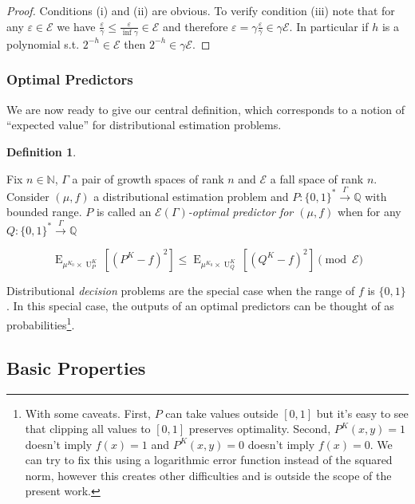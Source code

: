 \documentclass{article}
\numberwithin{equation}{section}
\theoremstyle{definition}
\newtheorem{definition}{Definition}[section]
\theoremstyle{plain}
\newcommand{\Bool}{\{0,1\}}
\newcommand{\Words}{{\Bool^*}}
\DeclareMathOperator{\E}{E}
\DeclareMathOperator{\Un}{U}
\newcommand{\Nats}{\mathbb{N}}
\newcommand{\Rats}{\mathbb{Q}}
\newcommand{\Fall}{\mathcal{E}}
\newcommand{\EG}{\Fall(\Gamma)}
\newcommand{\Scheme}{\xrightarrow{\Gamma}}
\begin{document}
\begin{proof}

Conditions (i) and (ii) are obvious. To verify condition (iii) note that for any $\varepsilon \in \Fall$ we have $\frac{\varepsilon}{\gamma} \leq \frac{\varepsilon}{\inf \gamma} \in \Fall$ and therefore $\varepsilon = \gamma \frac{\varepsilon}{\gamma} \in \gamma \Fall$. In particular if $h$ is a polynomial s.t. $2^{-h} \in \Fall$ then $2^{-h} \in \gamma \Fall$.
%
\end{proof}

\subsubsection{Optimal Predictors}

We are now ready to give our central definition, which corresponds to a notion of \enquote{expected value} for distributional estimation problems.

\begin{definition}
\label{def:op}

Fix $n \in \Nats$, $\Gamma$ a pair of growth spaces of rank $n$ and $\Fall$ a fall space of rank $n$. Consider $(\mu,f)$ a distributional estimation problem and $P: \Words \Scheme \Rats$ with bounded range. $P$ is called an \emph{$\EG$-optimal predictor for $(\mu,f)$} when for any $Q: \Words \Scheme \Rats$

\begin{equation}
\label{eqn:op}
\E_{\mu^{K_0} \times \Un_P^K}[(P^K - f)^2] \leq \E_{\mu^{K_0} \times \Un_Q^K}[(Q^K - f)^2] \pmod \Fall
\end{equation}

\end{definition}

Distributional \emph{decision} problems are the special case when the range of $f$ is $\Bool$. In this special case, the outputs of an optimal predictors can be thought of as probabilities\footnote{With some caveats. First, $P$ can take values outside $[0,1]$ but it's easy to see that clipping all values to $[0,1]$ preserves optimality. Second, $P^{K}(x,y)=1$ doesn't imply $f(x) = 1$ and $P^{K}(x,y)=0$ doesn't imply $f(x)=0$. We can try to fix this using a logarithmic error function instead of the squared norm, however this creates other difficulties and is outside the scope of the present work.}.

\subsection{Basic Properties}
\end{document}
